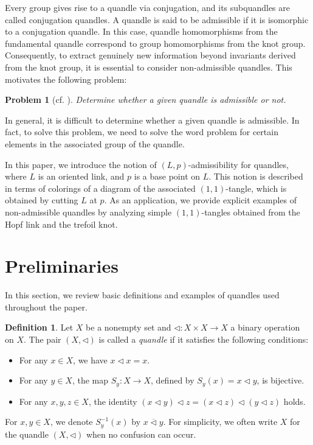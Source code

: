 \documentclass[12pt]{article}
\theoremstyle{plain}
\newtheorem{prob}[thm]{Problem}
\theoremstyle{definition}
\newtheorem{defn}[thm]{Definition}
\newcommand{\qop}{\triangleleft}
\begin{document}
Every group gives rise to a quandle via conjugation, and its subquandles are called conjugation quandles. 
A quandle is said to be admissible if it is isomorphic to a conjugation quandle. 
In this case, quandle homomorphisms from the fundamental quandle correspond to group homomorphisms from the knot group. 
Consequently, to extract genuinely new information beyond invariants derived from the knot group, 
it is essential to consider non-admissible quandles. This motivates the following problem:

\begin{prob}[cf. {\cite[Question 3.1]{Bardakov-2017-AutomorphismGroupsQuandlesArising}}]
  Determine whether a given quandle is admissible or not.
\end{prob}
In general, it is difficult to determine whether a given quandle is admissible.
In fact, to solve this problem, we need to solve the word problem for certain elements in the associated group of the quandle.

In this paper, we introduce the notion of $(L,p)$-admissibility for quandles, where $L$ is an oriented link, and $p$ is a base point on $L$. This notion is described in terms of colorings of a diagram of the associated $(1,1)$-tangle, which is obtained by cutting $L$ at $p$.
As an application, we provide explicit examples of non-admissible quandles by analyzing simple $(1,1)$-tangles obtained from the Hopf link and the trefoil knot.

\section{Preliminaries}
In this section, we review basic definitions and examples of quandles used throughout the paper.

\begin{defn}
  Let $X$ be a nonempty set and $\qop: X \times X \to X$ a binary operation on $X$.
  The pair $(X, \qop)$ is called a \textit{quandle} if it satisfies the following conditions:
  \begin{itemize}
    \item For any $x \in X$, we have $x \qop x = x$.
    \item For any $y \in X$, the map $S_{y}: X \to X$, defined by $S_{y}(x) = x \qop y$, is bijective.
    \item For any $x, y, z \in X$, 
    the identity $(x \qop y) \qop z = (x \qop z) \qop (y \qop z)$ holds.
  \end{itemize}
\end{defn}
For $x, y \in X$, we denote $S_{y}^{-1}(x)$ by $x \overline{\qop} y$.
For simplicity, we often write $X$ for the quandle $(X, \qop)$
when no confusion can occur.
\end{document}
